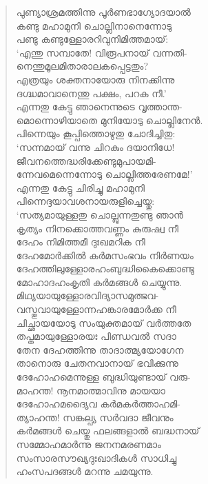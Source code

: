 \begin{verse}
പുണ്യാശ്രമത്തിന്നു പൂര്‍ണഭാഗ്യോദയാല്‍\\
കണ്ടു മഹാമുനി ചൊല്ലിനാനെന്നോടു\\
പണ്ടു കണ്ടുള്ളോരറിവുനിമിത്തമായ്:\\
‘എന്തു സമ്പാതേ! വിരൂപനായ് വന്നതി-\\
നെന്തുമൂലമിതാരാലകപ്പെട്ടതും?\\
എത്രയും ശക്തനായോരു നിനക്കിന്നു\\
ദഗ്ദ്ധമാവാനെന്തു പക്ഷം, പറക നീ.’\\
എന്നതു കേട്ടു ഞാനെന്നുടെ വൃത്താന്ത-\\
മൊന്നൊഴിയാതെ മുനിയോടു ചൊല്ലിനേന്‍.\\
പിന്നെയും കൂപ്പിത്തൊഴുതു ചോദിച്ചിതു:\\
‘സന്നമായ് വന്നു ചിറകും ദയാനിധേ!\\
ജീവനത്തെദ്ധരിക്കേണ്ടുമുപായമി-\\
ന്നേവമെന്നെന്നോടു ചൊല്ലിത്തരേണമേ!’\\
എന്നതു കേട്ടു ചിരിച്ചു മഹാമുനി\\
പിന്നെദ്ദയാവശനായരുളിച്ചെയ്തു:\\
‘സത്യമായുള്ളതു ചൊല്ലുന്നതുണ്ടു ഞാന്‍\\
കൃത്യം നിനക്കൊത്തവണ്ണം കുരുഷ്വ നീ\\
ദേഹം നിമിത്തമീ ദുഃഖമറിക നീ\\
ദേഹമോര്‍ക്കില്‍ കര്‍മസംഭവം നിര്‍ണയം\\
ദേഹത്തിലുള്ളോരഹംബുദ്ധികൈക്കൊണ്ടു\\
മോഹാദഹംകൃതി കര്‍മങ്ങള്‍ ചെയ്യുന്നു.\\
മിഥ്യയായുള്ളോരവിദ്യാസമുത്ഭവ-\\
വസ്തുവായുള്ളോന്നഹങ്കാരമോര്‍ക്ക നീ\\
ചിച്ഛായയോടു സംയുക്തമായ് വര്‍ത്തതേ\\
തപ്തമായുള്ളോരയഃ പിണ്ഡവല്‍ സദാ\\
തേന ദേഹത്തിന്നു താദാത്മ്യയോഗേന\\
താനൊരു ചേതനവാനായ് ഭവിക്കുന്നു\\
ദേഹോഹമെന്നുള്ള ബുദ്ധിയുണ്ടായ് വരു-\\
മാഹന്ത! നൂനമാത്മാവിനു മായയാ\\
ദേഹോഹമദ്യൈവ കര്‍മകര്‍ത്താഹമി-\\
ത്യാഹന്ത! സങ്കല്പ്യ സര്‍വദാ ജീവനും\\
കര്‍മങ്ങള്‍ ചെയ്തു ഫലങ്ങളാല്‍ ബദ്ധനായ്\\
സമ്മോഹമാര്‍ന്നു ജനനമരണമാം\\
സംസാരസൗഖ്യദുഃഖാദികള്‍ സാധിച്ചു\\
ഹംസപദങ്ങള്‍ മറന്നു ചമയുന്നു.\\

\end{verse}
